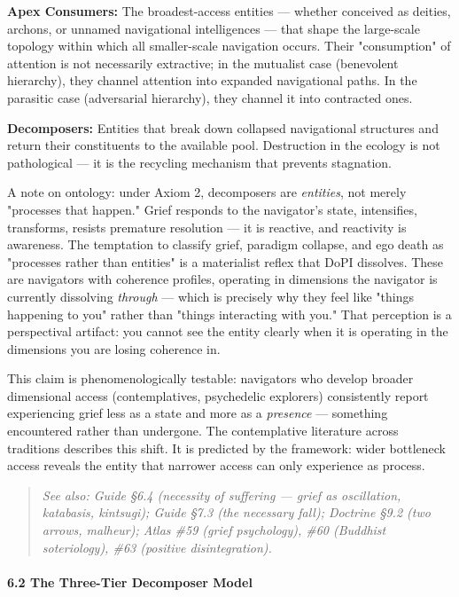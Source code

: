 \textbf{Apex Consumers:} The broadest-access entities — whether conceived as deities, archons, or unnamed navigational intelligences — that shape the large-scale topology within which all smaller-scale navigation occurs. Their "consumption" of attention is not necessarily extractive; in the mutualist case (benevolent hierarchy), they channel attention into expanded navigational paths. In the parasitic case (adversarial hierarchy), they channel it into contracted ones.


\textbf{Decomposers:} Entities that break down collapsed navigational structures and return their constituents to the available pool. Destruction in the ecology is not pathological — it is the recycling mechanism that prevents stagnation.


A note on ontology: under Axiom 2, decomposers are \textit{entities}, not merely "processes that happen." Grief responds to the navigator's state, intensifies, transforms, resists premature resolution — it is reactive, and reactivity is awareness. The temptation to classify grief, paradigm collapse, and ego death as "processes rather than entities" is a materialist reflex that DoPI dissolves. These are navigators with coherence profiles, operating in dimensions the navigator is currently dissolving \textit{through} — which is precisely why they feel like "things happening to you" rather than "things interacting with you." That perception is a perspectival artifact: you cannot see the entity clearly when it is operating in the dimensions you are losing coherence in.


This claim is phenomenologically testable: navigators who develop broader dimensional access (contemplatives, psychedelic explorers) consistently report experiencing grief less as a state and more as a \textit{presence} — something encountered rather than undergone. The contemplative literature across traditions describes this shift. It is predicted by the framework: wider bottleneck access reveals the entity that narrower access can only experience as process.


\begin{quote}
\itshape
\textit{See also: Guide §6.4 (necessity of suffering — grief as oscillation, katabasis, kintsugi); Guide §7.3 (the necessary fall); Doctrine §9.2 (two arrows, malheur); Atlas \#59 (grief psychology), \#60 (Buddhist soteriology), \#63 (positive disintegration).}
\end{quote}


\paragraph*{6.2 The Three-Tier Decomposer Model}


